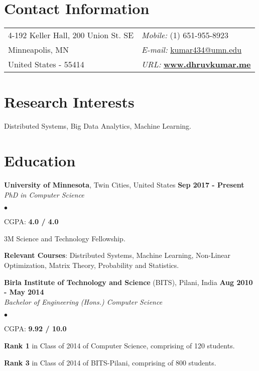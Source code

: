 \documentclass[margin,line]{res}
\newenvironment{list2}{
  \begin{list}{$\bullet$}{%
      \setlength{\itemsep}{0in}
      \setlength{\parsep}{0in} \setlength{\parskip}{0in}
      \setlength{\topsep}{0in} \setlength{\partopsep}{0in} 
      \setlength{\leftmargin}{0.2in}}}{\end{list}}
\begin{document}

\begin{resume}
\section{\sc Contact Information}
\vspace{.05in}
\begin{tabular}{@{}p{3in}p{4in}}
4-192 Keller Hall, 200 Union St. SE         & {\it Mobile:}  (1) 651-955-8923 \\
Minneapolis, MN & {\it E-mail:}  \href{mailto:kumar434@umn.edu }{kumar434@umn.edu }\\
 United States - 55414 &{\it URL:}  \href{http://www.dhruvkumar.me}{\bf www.dhruvkumar.me}
\end{tabular}


\section{\sc Research Interests}
Distributed Systems, Big Data Analytics, Machine Learning.

\section{\sc Education}
{\bf University of Minnesota}, Twin Cities, United States \hfill {\bf {Sep 2017 - Present}}\\
{\em PhD in Computer Science }
\vspace*{.3cm}
\begin{list2}
\item CGPA:  {\bf {4.0 / 4.0}}
\item 3M Science and Technology Fellowship.
\item {\bf Relevant Courses}: Distributed Systems, Machine Learning, Non-Linear Optimization, Matrix Theory, Probability and Statistics.

\end{list2}
{\bf Birla Institute of Technology and Science} (BITS), Pilani, India \hfill {\bf {Aug 2010 - May 2014}}\\
{\em Bachelor of Engineering (Hons.) Computer Science }
\vspace*{.3cm}
\begin{list2}
\item CGPA:  {\bf {9.92 / 10.0}}
\item {\bf Rank 1} in Class of 2014 of Computer Science, comprising of 120 students. 
\item {\bf Rank 3} in Class of 2014 of BITS-Pilani, comprising of 800 students.


\end{list2}
\end{resume}
\end{document}
